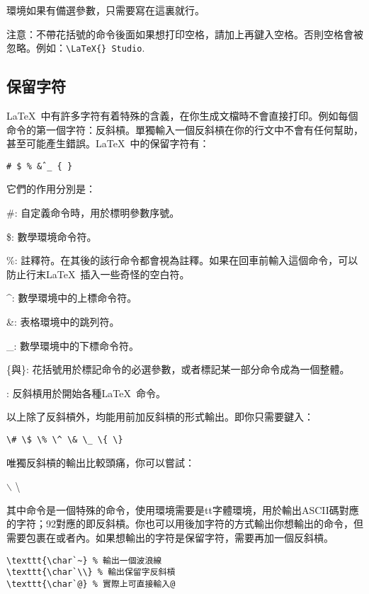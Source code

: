 環境如果有備選參數，只需要寫在這裏就行。

注意：不帶花括號的命令後面如果想打印空格，請加上再鍵入空格。否則空格會被忽略。例如：\verb+\LaTeX{} Studio+.

\subsection{保留字符}

\LaTeX\ 中有許多字符有着特殊的含義，在你生成文檔時不會直接打印。例如每個命令的第一個字符：反斜槓。單獨輸入一個反斜槓在你的行文中不會有任何幫助，甚至可能產生錯誤。\LaTeX\ 中的保留字符有：
\begin{center}
\texttt{\# \$ \% \^ \& \_ \{ \} }
\end{center}

它們的作用分別是：
\begin{para}
\item[\#{}:] 自定義命令時，用於標明參數序號。
\item[\${}:] 數學環境命令符。
\item[\%{}:] 註釋符。在其後的該行命令都會視為註釋。如果在回車前輸入這個命令，可以防止行末\LaTeX\ 插入一些奇怪的空白符。
\item[\^{}:] 數學環境中的上標命令符。
\item[\&{}:] 表格環境中的跳列符。
\item[\_{}:] 數學環境中的下標命令符。
\item[\{與\}:] 花括號用於標記命令的必選參數，或者標記某一部分命令成為一個整體。
\item[\char92{}:] 反斜槓用於開始各種\LaTeX\ 命令。
\end{para}

以上除了反斜槓外，均能用前加反斜槓的形式輸出。即你只需要鍵入：
\begin{center}
\verb|\# \$ \% \^ \& \_ \{ \}|
\end{center}

唯獨反斜槓的輸出比較頭痛，你可以嘗試：
\begin{codeshow}
$\backslash$ \textbackslash
\texttt{}
\end{codeshow}

其中命令是一個特殊的命令，使用環境需要是tt字體環境，用於輸出ASCII碼對應的字符；92對應的即反斜槓。你也可以用後加字符的方式輸出你想輸出的命令，但需要包裹在或者內。如果想輸出的字符是保留字符，需要再加一個反斜槓。
\begin{verbatim}
\texttt{\char`~} % 輸出一個波浪線
\texttt{\char`\\} % 輸出保留字反斜槓
\texttt{\char`@} % 實際上可直接輸入@
\end{verbatim}

